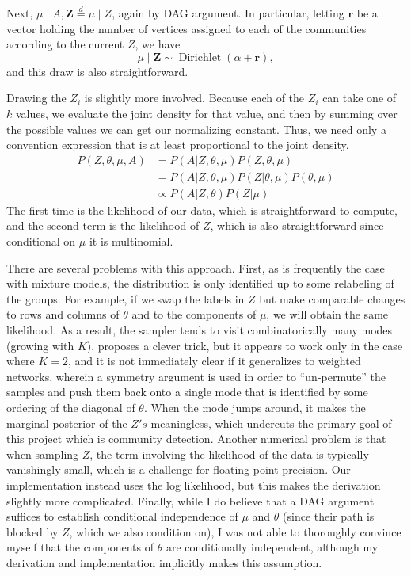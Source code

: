 \documentclass[11pt]{article}   %
\newcommand{\V}[1]{\ensuremath{\boldsymbol{#1}}}
\begin{document}
Next, $\mu \mid A, \V{Z} \overset{d}{=} \mu \mid Z$, again by DAG argument.
In particular, letting $\V{r}$ be a vector holding the number of vertices assigned to each of the communities according to the current $Z$, we have
\begin{equation*}
  \mu \mid \V{Z} \sim \operatorname{Dirichlet}(\alpha + \V{r}),
\end{equation*}
and this draw is also straightforward.

Drawing the $Z_i$ is slightly more involved.
Because each of the $Z_i$ can take one of $k$ values, we evaluate the joint density for that value, and then by summing over the possible values we can get our normalizing constant.
Thus, we need only a convention expression that is at least proportional to the joint density.
\begin{align*}
  P(Z, \theta, \mu, A) &= P(A | Z, \theta, \mu) P(Z, \theta, \mu) \\
                       &= P(A | Z, \theta, \mu) P(Z | \theta, \mu) P(\theta, \mu) \\
                       & \propto P(A | Z, \theta) P(Z | \mu)
\end{align*}
The first time is the likelihood of our data, which is straightforward to compute, and the second term is the likelihood of $Z$, which is also straightforward since conditional on $\mu$ it is multinomial.

There are several problems with this approach.
First, as is frequently the case with mixture models, the distribution is only identified up to some relabeling of the groups.
For example, if we swap the labels in $Z$ but make comparable changes to rows and columns of $\theta$ and to the components of $\mu$, we will obtain the same likelihood.
As a result, the sampler tends to visit combinatorically many modes (growing with $K$).
\textcite*{snijders_estimation_1997} proposes a clever trick, but it appears to work only in the case where $K=2$, and it is not immediately clear if it generalizes to weighted networks, wherein a symmetry argument is used in order to ``un-permute'' the samples and push them back onto a single mode that is identified by some ordering of the diagonal of $\theta$.
When the mode jumps around, it makes the marginal posterior of the $Z's$ meaningless, which undercuts the primary goal of this project which is community detection.
Another numerical problem is that when sampling $Z$, the term involving the likelihood of the data is typically vanishingly small, which is a challenge for floating point precision.
Our implementation instead uses the log likelihood, but this makes the derivation slightly more complicated.
Finally, while I do believe that a DAG argument suffices to establish conditional independence of $\mu$ and $\theta$ (since their path is blocked by $Z$, which we also condition on), I was not able to thoroughly convince myself that the components of $\theta$ are conditionally independent, although my derivation and implementation implicitly makes this assumption.
\end{document}
